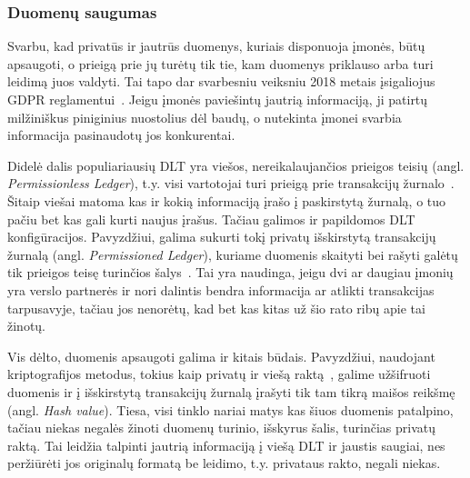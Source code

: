 
\subsubsection{Duomenų saugumas} \label{subsection:dlt-security}

Svarbu, kad privatūs ir jautrūs duomenys, kuriais disponuoja įmonės, būtų apsaugoti, o prieigą prie jų turėtų tik tie, kam duomenys priklauso arba turi leidimą juos valdyti. Tai tapo dar svarbesniu veiksniu 2018 metais įsigaliojus GDPR reglamentui~\cite{ferrari2018eu}. Jeigu įmonės paviešintų jautrią informaciją, ji patirtų milžiniškus piniginius nuostolius dėl baudų, o nutekinta įmonei svarbia informacija pasinaudotų jos konkurentai.

Didelė dalis populiariausių DLT yra viešos, nereikalaujančios prieigos teisių (angl. \textit{Permissionless Ledger}), t.y. visi vartotojai turi prieigą prie transakcijų žurnalo~\cite{olnes2017blockchain}. Šitaip viešai matoma kas ir kokią informaciją įrašo į paskirstytą žurnalą, o tuo pačiu bet kas gali kurti naujus įrašus. Tačiau galimos ir papildomos DLT konfigūracijos. Pavyzdžiui, galima sukurti tokį privatų išskirstytą transakcijų žurnalą (angl. \textit{Permissioned Ledger}), kuriame duomenis skaityti bei rašyti galėtų tik prieigos teisę turinčios šalys~\cite{backlund2016technical}. Tai yra naudinga, jeigu dvi ar daugiau įmonių yra verslo partnerės ir nori dalintis bendra informacija ar atlikti transakcijas tarpusavyje, tačiau jos nenorėtų, kad bet kas kitas už šio rato ribų apie tai žinotų. 

Vis dėlto, duomenis apsaugoti galima ir kitais būdais. Pavyzdžiui, naudojant kriptografijos metodus, tokius kaip privatų ir viešą raktą~\cite{zyskind2015decentralizing}, galime užšifruoti duomenis ir į išskirstytą transakcijų žurnalą įrašyti tik tam tikrą maišos reikšmę (angl. \textit{Hash value}). Tiesa, visi tinklo nariai matys kas šiuos duomenis patalpino, tačiau niekas negalės žinoti duomenų turinio, išskyrus šalis, turinčias privatų raktą. Tai leidžia talpinti jautrią informaciją į viešą DLT ir jaustis saugiai, nes peržiūrėti jos originalų formatą be leidimo, t.y. privataus rakto, negali niekas.




